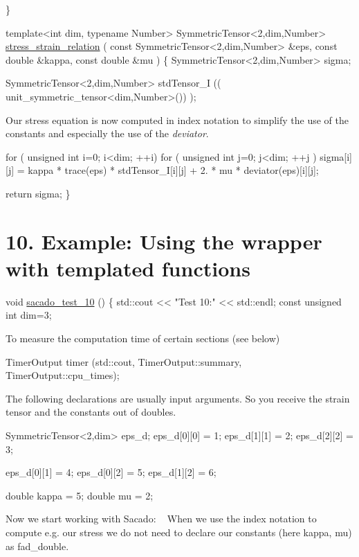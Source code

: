 \begin{DoxyCode}
\}
 
 
\textcolor{keyword}{template}<\textcolor{keywordtype}{int} dim, \textcolor{keyword}{typename} Number>
SymmetricTensor<2,dim,Number> \hyperlink{Sacado__example_8cc_ae6e87a9cc06bd452cb5a1bfec2245569}{stress\_strain\_relation} ( \textcolor{keyword}{const} 
      SymmetricTensor<2,dim,Number> &eps, \textcolor{keyword}{const} \textcolor{keywordtype}{double} &kappa, \textcolor{keyword}{const} \textcolor{keywordtype}{double} &mu )
\{
    SymmetricTensor<2,dim,Number> sigma;
 
    SymmetricTensor<2,dim,Number> stdTensor\_I (( unit\_symmetric\_tensor<dim,Number>()) );
\end{DoxyCode}
 Our stress equation is now computed in index notation to simplify the use of the constants and especially the use of the {\itshape deviator}. 
\begin{DoxyCode}
     \textcolor{keywordflow}{for} ( \textcolor{keywordtype}{unsigned} \textcolor{keywordtype}{int} i=0; i<dim; ++i)
        \textcolor{keywordflow}{for} ( \textcolor{keywordtype}{unsigned} \textcolor{keywordtype}{int} j=0; j<dim; ++j )
            sigma[i][j] = kappa * trace(eps) *  stdTensor\_I[i][j] + 2. * mu * deviator(eps)[i][j];
 
    \textcolor{keywordflow}{return} sigma;
\}
\end{DoxyCode}
 \hypertarget{index_Ex10}{}\section{10. Example\+: Using the wrapper with templated functions}\label{index_Ex10}

\begin{DoxyCode}
\textcolor{keywordtype}{void} \hyperlink{Sacado__example_8cc_a70dbdff0078e09883ba02d2724a432b2}{sacado\_test\_10} ()
\{
    std::cout << \textcolor{stringliteral}{"Test 10:"} << std::endl;
    \textcolor{keyword}{const} \textcolor{keywordtype}{unsigned} \textcolor{keywordtype}{int} dim=3;
\end{DoxyCode}
 To measure the computation time of certain sections (see below) 
\begin{DoxyCode}
TimerOutput timer (std::cout, TimerOutput::summary, TimerOutput::cpu\_times);
\end{DoxyCode}
 The following declarations are usually input arguments. So you receive the strain tensor and the constants out of doubles. 
\begin{DoxyCode}
SymmetricTensor<2,dim> eps\_d;
eps\_d[0][0] = 1;
eps\_d[1][1] = 2;
eps\_d[2][2] = 3;

eps\_d[0][1] = 4;
eps\_d[0][2] = 5;
eps\_d[1][2] = 6;

\textcolor{keywordtype}{double} kappa = 5;
\textcolor{keywordtype}{double} mu = 2;
\end{DoxyCode}
 Now we start working with Sacado\+: ~\newline
When we use the index notation to compute e.\+g. our stress we do not need to declare our constants (here kappa, mu) as fad\+\_\+double.

